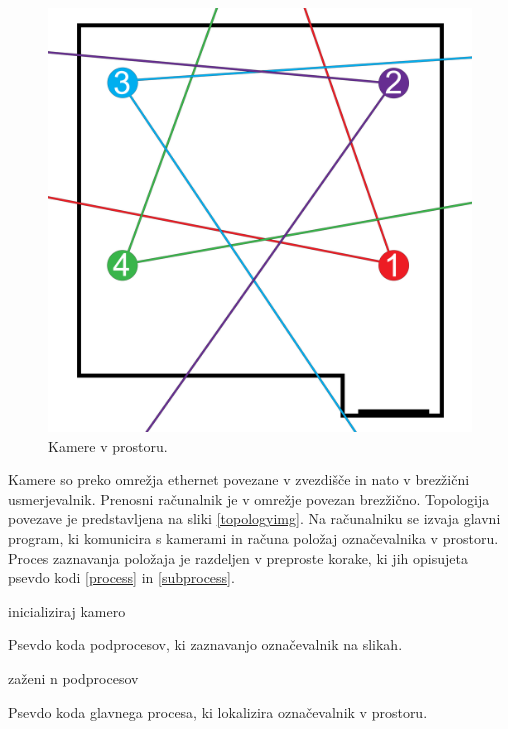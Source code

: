 \documentclass[a4paper, 12pt]{book}
\begin{document}
\begin{figure}[H]
\centering
\includegraphics[scale=0.5]{room_setting.png}
\caption{Kamere v prostoru.}
\end{figure}

Kamere so preko omrežja ethernet povezane v zvezdišče in nato v brezžični usmerjevalnik. Prenosni računalnik je v omrežje povezan brezžično. Topologija povezave je predstavljena na sliki \ref{topologyimg}. Na računalniku se izvaja glavni program, ki komunicira s kamerami in računa položaj označevalnika v prostoru. Proces zaznavanja položaja je razdeljen v preproste korake, ki jih opisujeta psevdo kodi \ref{process} in \ref{subprocess}. \\

\begin{algorithm}[H]
 inicializiraj kamero\;
 \caption{Psevdo koda podprocesov, ki zaznavanjo označevalnik na slikah.}
\label{subprocess}
\end{algorithm}
\vspace{1em}
\begin{algorithm}[H]
 zaženi n podprocesov\;
 \caption{Psevdo koda glavnega procesa, ki lokalizira označevalnik v prostoru.}
\label{process}
\end{algorithm}
\end{document}
